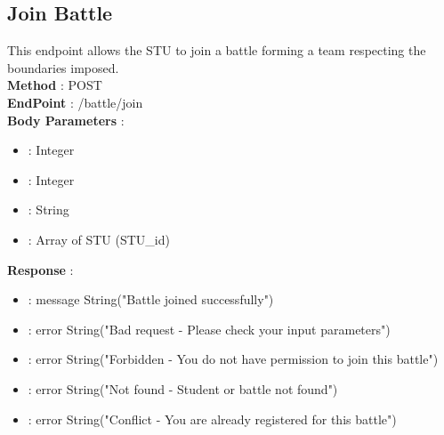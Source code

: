 \subsection*{Join Battle}
This endpoint allows the STU to join a battle forming a team respecting the boundaries imposed.\\
\textbf{Method} : POST \\
\textbf{EndPoint} : /battle/join \\
\textbf{Body Parameters} :
\begin{itemize}
    \item {} : Integer   
    \item {} : Integer  
    \item {} : String  
    \item {} : Array of STU (STU\_id)  
\end{itemize}
\textbf{Response} :
\begin{itemize}
    \item {} : message String("Battle joined successfully")
    \item {} : error String("Bad request - Please check your input parameters")
    \item {} : error String("Forbidden - You do not have permission to join this battle")
    \item {} : error String("Not found - Student or battle not found")
    \item {} : error String("Conflict - You are already registered for this battle")
\end{itemize}

